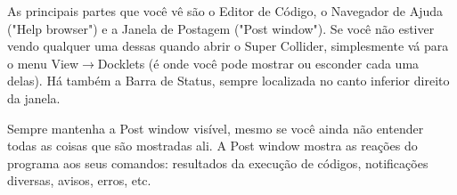 As principais partes que você vê são o Editor de Código, o Navegador de Ajuda ("Help browser") e a Janela de Postagem ("Post window"). Se você não estiver vendo qualquer uma dessas quando abrir o Super Collider, simplesmente vá para o menu View$\rightarrow$Docklets (é onde você pode mostrar ou esconder cada uma delas). Há também a Barra de Status, sempre localizada no canto inferior direito da janela.

Sempre mantenha a Post window visível, mesmo se você ainda não entender todas as coisas que são mostradas ali. A Post window mostra as reações do programa aos seus comandos: resultados da execução de códigos, notificações diversas, avisos, erros, etc.

\bigskip
{}
\bigskip


